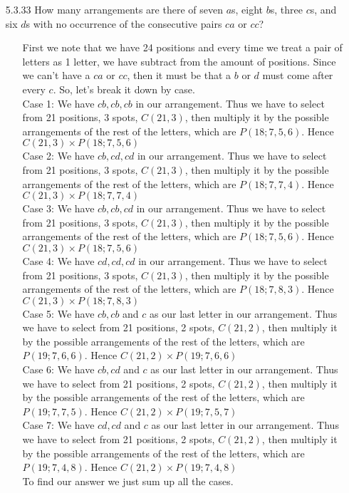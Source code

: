 \documentclass[12pt]{article}
\begin{document}
\begin{enumerate}
\item[5.3.33] How many arrangements are there of seven $a$s, eight $b$s, three $c$s, and six $d$s with no occurrence of the consecutive pairs $ca$ or $cc$?
\begin{enumerate}
\item[] First we note that we have 24 positions and every time we treat a pair of letters as 1 letter, we have
subtract from the amount of positions. Since we can't have a $ca$ or $cc$, then it must be that a $b$ or $d$ must come after every $c$. So, let's break
it down by case. \\
Case 1: We have $cb, cb, cb$ in our arrangement. Thus we have to select from 21 positions, 3 spots, $C(21, 3)$,
then multiply it by the possible arrangements of the rest of the letters, which are $P(18; 7, 5, 6)$. Hence
$C(21, 3) \times P(18; 7, 5, 6)$ \\
Case 2: We have $cb, cd, cd$ in our arrangement. Thus we have to select from 21 positions, 3 spots, $C(21, 3)$,
then multiply it by the possible arrangements of the rest of the letters, which are $P(18; 7, 7, 4)$. Hence
$C(21, 3) \times P(18; 7, 7, 4)$ \\
Case 3: We have $cb, cb, cd$ in our arrangement. Thus we have to select from 21 positions, 3 spots, $C(21, 3)$,
then multiply it by the possible arrangements of the rest of the letters, which are $P(18; 7, 5, 6)$. Hence
$C(21, 3) \times P(18; 7, 5, 6)$ \\
Case 4: We have $cd, cd, cd$ in our arrangement. Thus we have to select from 21 positions, 3 spots, $C(21, 3)$,
then multiply it by the possible arrangements of the rest of the letters, which are $P(18; 7, 8, 3)$. Hence
$C(21, 3) \times P(18; 7, 8, 3)$ \\
Case 5: We have $cb, cb$ and $c$ as our last letter in our arrangement. Thus we have to select from 
21 positions, 2 spots, $C(21, 2)$, then multiply it by the possible arrangements of the rest of the letters, 
which are $P(19; 7, 6, 6)$. Hence $C(21, 2) \times P(19; 7, 6, 6)$ \\
Case 6: We have $cb, cd$ and $c$ as our last letter in our arrangement. Thus we have to select from 
21 positions, 2 spots, $C(21, 2)$, then multiply it by the possible arrangements of the rest of the letters, 
which are $P(19; 7, 7, 5)$. Hence $C(21, 2) \times P(19; 7, 5, 7)$ \\
Case 7: We have $cd, cd$ and $c$ as our last letter in our arrangement. Thus we have to select from 
21 positions, 2 spots, $C(21, 2)$, then multiply it by the possible arrangements of the rest of the letters, 
which are $P(19; 7, 4, 8)$. Hence $C(21, 2) \times P(19; 7, 4, 8)$ \\
To find our answer we just sum up all the cases.
\end{enumerate}


\end{enumerate}
\end{document}
